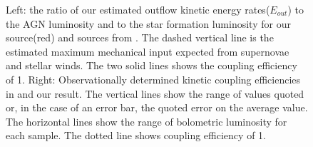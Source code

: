 \documentclass{subfiles}
\begin{document}
	\begin{figure}[htp]
		\centering
		\label{coupeffic}
		\caption{Left: the ratio of our estimated outflow kinetic energy rates($E_{out}$) to the AGN luminosity and to the star formation luminosity for our source(red) and sources from \cite{harrison2014kiloparsec}. The dashed vertical line is the estimated maximum mechanical input expected from supernovae and stellar winds. The two solid lines shows the coupling efficiency of 1. Right: Observationally determined kinetic coupling efficiencies in \cite{harrison2018agn} and our result. The vertical lines show the range of values quoted or, in the case of an error bar, the quoted error on the average value. The horizontal lines show the range of bolometric luminosity for each sample. The dotted line shows coupling efficiency of 1. }
	\end{figure}
	
\end{document}

